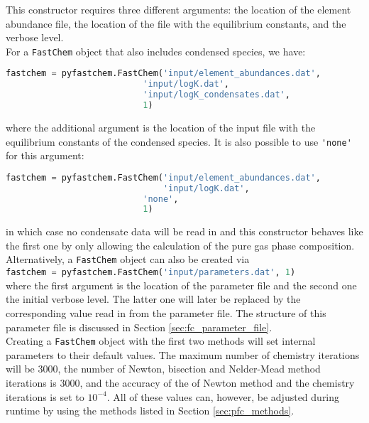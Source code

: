 \documentclass[numbers=noenddot]{aux/fcmanual}
\newcommand{\fc}{\texttt{FastChem}\xspace}
\begin{document}
This constructor requires three different arguments: the location of the element abundance file, the location of the file with the equilibrium constants, and the verbose level. \\

For a \fc object that also includes condensed species, we have:
\begin{lstlisting}[language=Python]
fastchem = pyfastchem.FastChem('input/element_abundances.dat', 
	                       'input/logK.dat', 
	                       'input/logK_condensates.dat', 
	                       1)
\end{lstlisting}

where the additional argument is the location of the input file with the equilibrium constants of the condensed species. It is also possible to use \verb|'none'| for this argument:

\begin{lstlisting}[language=Python]
fastchem = pyfastchem.FastChem('input/element_abundances.dat', 
                               'input/logK.dat', 
	                       'none', 
	                       1)
\end{lstlisting}

in which case no condensate data will be read in and this constructor behaves like the first one by only allowing the calculation of the pure gas phase composition.\\

Alternatively, a \fc object can also be created via\\

\lstinline[language=Python]!fastchem = pyfastchem.FastChem('input/parameters.dat', 1)!\\

where the first argument is the location of the parameter file and the second one the initial verbose level. The latter one will later be replaced by the corresponding value read in from the parameter file. The structure of this parameter file is discussed in Section \ref{sec:fc_parameter_file}.\\

Creating a \fc object with the first two methods will set internal parameters to their default values. The maximum number of chemistry iterations will be 3000, the number of Newton, bisection and Nelder-Mead method iterations is 3000, and the accuracy of the of Newton method and the chemistry iterations is set to $10^{-4}$. All of these values can, however, be adjusted during runtime by using the methods listed in Section \ref{sec:pfc_methods}.\\
\end{document}
